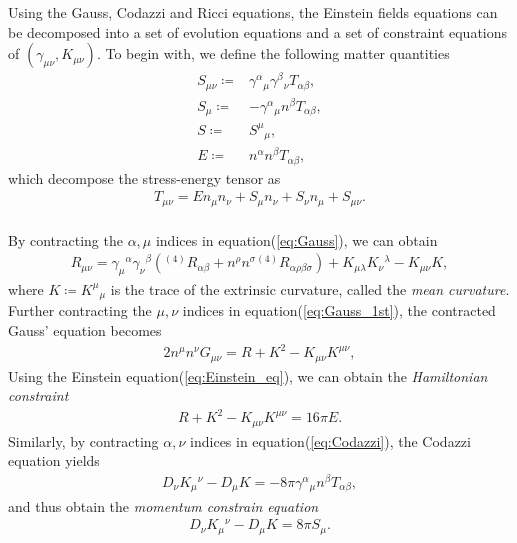 Using the Gauss, Codazzi and Ricci equations,
the Einstein fields equations can be decomposed into a set of evolution equations and a set of constraint equations of $(\gamma_{\mu\nu}, K_{\mu\nu})$.
To begin with, we define the following matter quantities
\begin{align}
    S_{\mu\nu} \coloneqq& \gamma^{\alpha}{}_{\mu} \gamma^{\beta}{}_{\nu} T_{\alpha\beta}, \\
    S_\mu \coloneqq& - \gamma^{\alpha}{}_{\mu} n^{\beta} T_{\alpha\beta}, \\
    S \coloneqq& S^\mu{}_\mu, \\
    E \coloneqq& n^\alpha n^\beta T_{\alpha\beta},
\end{align}
which decompose the stress-energy tensor as
\begin{align}
    T_{\mu\nu} = E n_\mu n_\nu + S_\mu n_\nu + S_\nu n_\mu + S_{\mu\nu}.
\end{align}\\
By contracting the $\alpha,\mu$ indices in equation(\ref{eq:Gauss}), we can obtain
\begin{align}\label{eq:Gauss_1st}
    R_{\mu\nu} = \gamma_{\mu}{}^{\alpha}\gamma_{\nu}{}^{\beta} \left( {}^{(4)} R_{\alpha\beta} + n^\rho n^\sigma {}^{(4)}R_{\alpha\rho\beta\sigma} \right) + K_{\mu\lambda} K_\nu{}^{\lambda} - K_{\mu\nu} K,
\end{align}
where $K\coloneqq K^\mu{}_{\mu}$ is the trace of the extrinsic curvature,
called the \textit{mean curvature}.
Further contracting the $\mu, \nu$ indices in equation(\ref{eq:Gauss_1st}), the contracted Gauss' equation becomes
\begin{align}\label{eq:Gaussr_2nd}
    2 n^\mu n^\nu G_{\mu\nu} = R + K^2 - K_{\mu\nu} K^{\mu\nu},
\end{align}
Using the Einstein equation(\ref{eq:Einstein_eq}), we can obtain the \textit{Hamiltonian constraint}
\begin{align}
    R + K^2 - K_{\mu\nu} K^{\mu\nu} = 16\pi E.
\end{align}
Similarly, by contracting $\alpha, \nu$ indices in equation(\ref{eq:Codazzi}), the Codazzi equation yields
\begin{align}
    D_{\nu} K_{\mu}{}^{\nu} - D_\mu K = - 8\pi \gamma^{\alpha}{}_{\mu} n^{\beta} T_{\alpha\beta},
\end{align}
and thus obtain the \textit{momentum constrain equation}
\begin{align}
    D_{\nu} K_{\mu}{}^{\nu} - D_\mu K = 8 \pi S_{\mu}.
\end{align}\\
